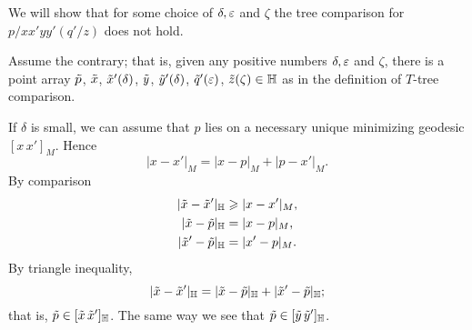 We will  show that for some choice of $\delta,\eps$ and $\zeta$ the tree comparison for $p/xx'yy'(q'/z)$ does not hold.

Assume the contrary; that is, given any positive numbers $\delta,\eps$ and $\zeta$, there is a point array $\~p$, $\~x$, $\~x'(\delta)$, $\~y$, $\~y'(\delta)$, $\~q'(\eps)$, $\~z(\zeta)\in\HH$ as in the definition of $T$-tree comparison.

\begin{wrapfigure}{r}{35 mm}
\end{wrapfigure}

If $\delta$ is small, we can assume that $p$ lies on a necessary unique minimizing geodesic $[x\,x']_M$.
Hence 
\[|x-x'|_M=|x-p|_M+|p-x'|_M.\]
By comparison
\begin{align*}
|\~x-\~x'|_\HH&\ge|x-x'|_M,
\\
|\~x-\~p|_\HH&=|x-p|_M,
\\
|\~x'-\~p|_\HH&=|x'-p|_M.
\end{align*}
By triangle inequality,
\[|\~x-\~x'|_\HH=|\~x-\~p|_\HH+|\~x'-\~p|_\HH;\]
that is, $\~p\in [\~x\,\~x']_\HH$.
The same way we see that $\~p\in [\~y\,\~y']_\HH$.

